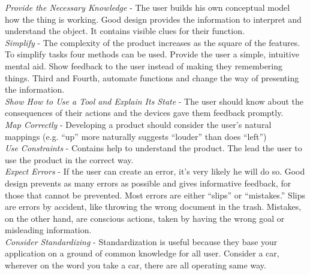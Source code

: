 \documentclass[american,a4paper,oneside,,tablecaptionabove]{scrbook}
\begin{document}
\emph{Provide the Necessary Knowledge} - The user builds his own
conceptual model how the thing is working. Good design provides the
information to interpret and understand the object. It contains visible
clues for their function.\\
\emph{Simplify} - The complexity of the product increases as the square
of the features. To simplify tasks four methods can be used. Provide the
user a simple, intuitive mental aid. Show feedback to the user instead
of making they remembering things. Third and Fourth, automate functions
and change the way of presenting the information.\\
\emph{Show How to Use a Tool and Explain Its State} - The user should
know about the consequences of their actions and the devices gave them
feedback promptly.\\
\emph{Map Correctly} - Developing a product should consider the user's
natural mappings (e.g. \enquote{up} more naturally suggests
\enquote{louder} than does \enquote{left})\\
\emph{Use Constraints} - Contains help to understand the product. The
lead the user to use the product in the correct way.\\
\emph{Expect Errors} - If the user can create an error, it's very likely
he will do so. Good design prevents as many errors as possible and gives
informative feedback, for those that cannot be prevented. Most errors
are either \enquote{slips} or \enquote{mistakes.} Slips are errors by
accident, like throwing the wrong document in the trash. Mistakes, on
the other hand, are conscious actions, taken by having the wrong goal or
misleading information.\\
\emph{Consider Standardizing} - Standardization is useful because they
base your application on a ground of common knowledge for all user.
Consider a car, wherever on the word you take a car, there are all
operating same way.
\end{document}
